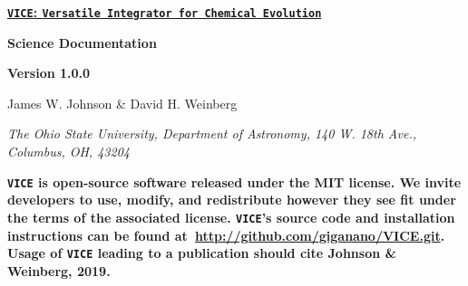 \documentclass{report}
\begin{document}
\begin{center}
\underline{\LARGE
	\textbf{\texttt{VICE}: \texttt{Versatile Integrator for Chemical 
	Evolution}}
}
\par\null\par
{\LARGE \textbf{Science Documentation}}
\par\null\par
{\Large \textbf{Version 1.0.0}}
\par\null\par
{\Large
James W. Johnson \& David H. Weinberg 
} \par
\textit{The Ohio State University, Department of Astronomy, 140 W. 18th 
Ave., Columbus, OH, 43204}

\par\null\par\noindent
\textbf{\texttt{VICE} is open-source software released under the MIT license. 
We invite developers to use, modify, and redistribute however they see fit 
under the terms of the associated license. \texttt{VICE}'s source code and 
installation instructions can be found 
at~\url{http://github.com/giganano/VICE.git}. Usage of \texttt{VICE} leading 
to a publication should cite Johnson \& Weinberg, 2019. }
\end{center}
\end{document}
